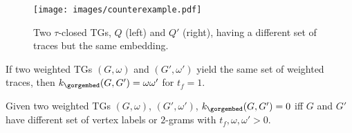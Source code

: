 \begin{figure}[!t]
	\vspace*{-0.5cm}
	\centering
	\texttt{[image: images/counterexample.pdf]}
	\caption{Two $\tau$-closed TGs, $Q$ (left) and $Q'$ (right), having a different set of traces but the same embedding.}\label{fig:counterexample}
\end{figure}

\begin{lemma}
	\label{we}
	If two weighted TGs $(G,\omega)$ and $(G',\omega')$ yield the same set of weighted traces, then 
	$k_{\gorgembed}(G,G')=\omega\omega'$ for $t_f=1$.
\end{lemma}

 

\begin{lemma}
	\label{lem:sdiss}
	Given two weighted TGs $(G,\omega)$, $(G',\omega')$, $k_{\gorgembed}(G,G')=0$ iff $G$ and $G'$ have different set 
	of vertex labels or $2$-grams with $t_f,\omega,\omega'>0$.
\end{lemma}




